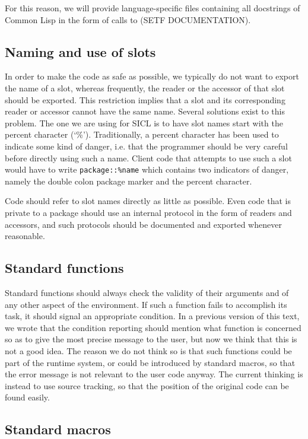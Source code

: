 \documentclass{article}
\def\sysname{SICL}
\begin{document}
For this reason, we will provide language-specific files containing
all docstrings of Common Lisp in the form of calls to (SETF
DOCUMENTATION). 

\subsection{Naming and use of slots}

In order to make the code as safe as possible, we typically do not
want to export the name of a slot, whereas frequently, the reader or
the accessor of that slot should be exported.  This restriction
implies that a slot and its corresponding reader or accessor cannot
have the same name.  Several solutions exist to this problem.  The one
we are using for \sysname{} is to have slot names start with the
percent character (`\%').  Traditionally, a percent character has been
used to indicate some kind of danger, i.e. that the programmer should
be very careful before directly using such a name.  Client code that
attempts to use such a slot would have to write
\texttt{package::\%name} which contains two indicators of danger,
namely the double colon package marker and the percent character.

Code should refer to slot names directly as little as possible.  Even
code that is private to a package should use an internal protocol in
the form of readers and accessors, and such protocols should be
documented and exported whenever reasonable. 

\subsection{Standard functions}

Standard functions should always check the validity of their arguments
and of any other aspect of the environment.  If such a function fails
to accomplish its task, it should signal an appropriate condition.  In
a previous version of this text, we wrote that the condition reporting
should mention what function is concerned so as to give the most
precise message to the user, but now we think that this is not a good
idea.  The reason we do not think so is that such functions could be
part of the runtime system, or could be introduced by standard macros,
so that the error message is not relevant to the user code anyway.
The current thinking is instead to use source tracking, so that the
position of the original code can be found easily. 

\subsection{Standard macros}
\end{document}
